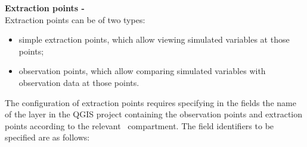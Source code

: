 \vspace{8pt}

\textbf{Extraction points - } \\
Extraction points can be of two types:
\begin{itemize}
    \item[$\bullet$] simple extraction points, which allow
    viewing simulated variables at those points;
    \item[$\bullet$] observation points, which allow comparing simulated variables with observation data at those points.
\end{itemize}



The configuration of extraction points requires specifying in the  fields the name of the layer in the QGIS project containing the observation points and extraction points according to the relevant \cws~compartment. The field identifiers to be specified are as follows: 
\vspace{8pt}


